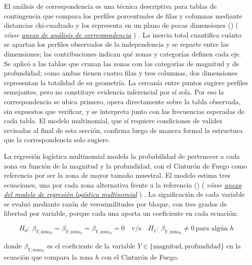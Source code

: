 \documentclass[
  spanish,
  letterpaper,
  DIV=11,
  numbers=noendperiod]{scrartcl}
\newcommand{\asesoriaParenRef}[1]{%
  \textnormal{\textcolor{asesoriaTextColor}{(}}%
  {\hypersetup{linkcolor=asesoriaLinkColor,urlcolor=asesoriaLinkColor,citecolor=asesoriaLinkColor}\textcolor{asesoriaTextColor}{\emph{#1}}}%
  \textnormal{\textcolor{asesoriaTextColor}{)}}%
}
\begin{document}
El análisis de correspondencia es una técnica descriptiva para tablas de
contingencia que compara los perfiles porcentuales de filas y columnas
mediante distancias chi-cuadrado y los representa en un plano de pocas
dimensiones ()
\asesoriaParenRef{véase \hyperref[sec-anexo-correspondencia]{anexo de análisis de correspondencia}}.
La inercia total cuantifica cuánto se apartan los perfiles observados de
la independencia y se reparte entre las dimensiones; las contribuciones
indican qué zonas y categorías definen cada eje. Se aplicó a las tablas
que cruzan las zonas con las categorías de magnitud y de profundidad;
como ambas tienen cuatro filas y tres columnas, dos dimensiones
representan la totalidad de su geometría. La cercanía entre puntos
sugiere perfiles semejantes, pero no constituye evidencia inferencial
por sí sola. Por eso la correspondencia se ubica primero, opera
directamente sobre la tabla observada, sin supuestos que verificar, y se
interpreta junto con las frecuencias esperadas de cada tabla. El modelo
multinomial, que sí requiere condiciones de validez revisadas al final
de esta sección, confirma luego de manera formal la estructura que la
correspondencia solo sugiere.

La regresión logística multinomial modela la probabilidad de pertenecer
a cada zona en función de la magnitud y la profundidad, con el Cinturón
de Fuego como referencia por ser la zona de mayor tamaño muestral. El
modelo estima tres ecuaciones, una por cada zona alternativa frente a la
referencia ()
\asesoriaParenRef{véase \hyperref[sec-anexo-multinomial]{anexo del modelo de regresión logística multinomial}}.
La significación de cada variable se evaluó mediante razón de
verosimilitudes por bloque, con tres grados de libertad por variable,
porque cada una aporta un coeficiente en cada ecuación:

\begingroup
\setlength{\abovedisplayskip}{0pt}
\setlength{\belowdisplayskip}{0pt}
\setlength{\abovedisplayshortskip}{0pt}
\setlength{\belowdisplayshortskip}{0pt}
\vspace{-1.10em}
\[
H_0:\ \beta_{Y,\text{zona}_2}=\beta_{Y,\text{zona}_3}=\beta_{Y,\text{zona}_4}=0
\quad \text{v/s} \quad
H_1:\ \beta_{Y,\text{zona}_h}\neq 0 \ \text{para algún } h
\]
\vspace{-1.15em}
\endgroup

donde \(\beta_{Y,\text{zona}_h}\) es el coeficiente de la variable
\(Y \in \{\text{magnitud},\text{profundidad}\}\) en la ecuación que
compara la zona \(h\) con el Cinturón de Fuego.
\end{document}
